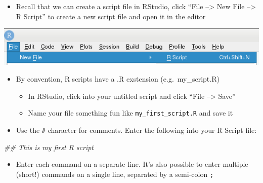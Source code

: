 \documentclass[
]{book}
\newenvironment{Shaded}{\begin{snugshade}}{\end{snugshade}}
\newcommand{\CommentTok}[1]{\textcolor[rgb]{0.56,0.35,0.01}{\textit{#1}}}
\newcommand{\KeywordTok}[1]{\textcolor[rgb]{0.13,0.29,0.53}{\textbf{#1}}}
\newcommand{\NormalTok}[1]{#1}
\newcommand{\StringTok}[1]{\textcolor[rgb]{0.31,0.60,0.02}{#1}}
\providecommand{\tightlist}{%
  \setlength{\itemsep}{0pt}\setlength{\parskip}{0pt}}
\begin{document}
\begin{itemize}
\tightlist
\item
  Recall that we can create a script file in RStudio, click ``File --\textgreater{} New File --\textgreater{} R Script'' to create a new script file and open it in the editor
\end{itemize}

\begin{center}\includegraphics[width=0.6\linewidth]{images/rstudio_new_rscript_file} \end{center}

\begin{itemize}
\tightlist
\item
  By convention, R scripts have a .R exstension (e.g.~my\_script.R)

  \begin{itemize}
  \tightlist
  \item
    In RStudio, click into your untitled script and click ``File --\textgreater{} Save''
  \item
    Name your file something fun like \texttt{my\_first\_script.R} and save it
  \end{itemize}
\item
  Use the \texttt{\#} character for comments. Enter the following into your R Script file:
\end{itemize}

\begin{Shaded}
\begin{Highlighting}[]
\CommentTok{## This is my first R script}
\end{Highlighting}
\end{Shaded}

\begin{itemize}
\tightlist
\item
  Enter each command on a separate line. It's also possible to enter multiple (short!) commands on a single line, separated by a semi-colon \texttt{;}
\end{itemize}

\begin{Shaded}
\end{Shaded}
\end{document}
